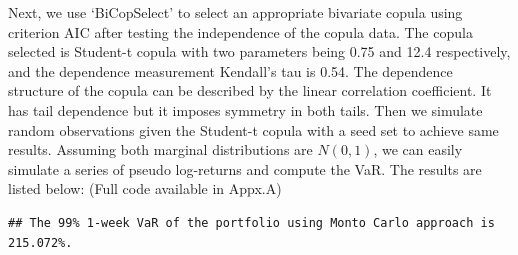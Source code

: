 \documentclass[]{article}
\newenvironment{Shaded}{\begin{snugshade}}{\end{snugshade}}
\newcommand{\CommentTok}[1]{\textcolor[rgb]{0.56,0.35,0.01}{\textit{#1}}}
\newcommand{\DataTypeTok}[1]{\textcolor[rgb]{0.13,0.29,0.53}{#1}}
\newcommand{\DecValTok}[1]{\textcolor[rgb]{0.00,0.00,0.81}{#1}}
\newcommand{\FloatTok}[1]{\textcolor[rgb]{0.00,0.00,0.81}{#1}}
\newcommand{\KeywordTok}[1]{\textcolor[rgb]{0.13,0.29,0.53}{\textbf{#1}}}
\newcommand{\NormalTok}[1]{#1}
\newcommand{\OperatorTok}[1]{\textcolor[rgb]{0.81,0.36,0.00}{\textbf{#1}}}
\newcommand{\StringTok}[1]{\textcolor[rgb]{0.31,0.60,0.02}{#1}}
\begin{document}
Next, we use `BiCopSelect' to select an appropriate bivariate copula
using criterion AIC after testing the independence of the copula data.
The copula selected is Student-t copula with two parameters being 0.75
and 12.4 respectively, and the dependence measurement Kendall's tau is
0.54. The dependence structure of the copula can be described by the
linear correlation coefficient. It has tail dependence but it imposes
symmetry in both tails. Then we simulate random observations given the
Student-t copula with a seed set to achieve same results. Assuming both
marginal distributions are \(N(0, 1)\), we can easily simulate a series
of pseudo log-returns and compute the VaR. The results are listed below:
(Full code available in Appx.A)

\begin{Shaded}
\end{Shaded}

\begin{verbatim}
## The 99% 1-week VaR of the portfolio using Monto Carlo approach is 215.072%.
\end{verbatim}
\end{document}

